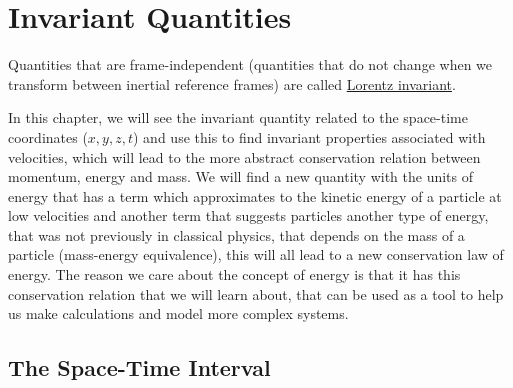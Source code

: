 






\printbibliography[segment=\therefsegment, heading=subbibliography]

\chapter{Invariant Quantities} \label{ch: Invariant Quantities}

Quantities that are frame-independent (quantities that do not change when we transform between inertial reference frames) are called \hyperlink{def-lorentz-invariant}{Lorentz invariant}.

In this chapter, we will see the invariant quantity related to the space-time coordinates ($x,y,z,t$) and use this to find invariant properties associated with velocities, which will lead to the more abstract conservation relation between momentum, energy and mass.
We will find a new quantity with the units of energy that has a term which approximates to the kinetic energy of a particle at low velocities and another term that suggests particles another type of energy, that was not previously in classical physics, that depends on the mass of a particle (mass-energy equivalence), this will all lead to a new conservation law of energy.
The reason we care about the concept of energy is that it has this conservation relation that we will learn about, that can be used as a tool to help us make calculations and model more complex systems.

\section{The Space-Time Interval} \label{sect: Space-Time Interval}

